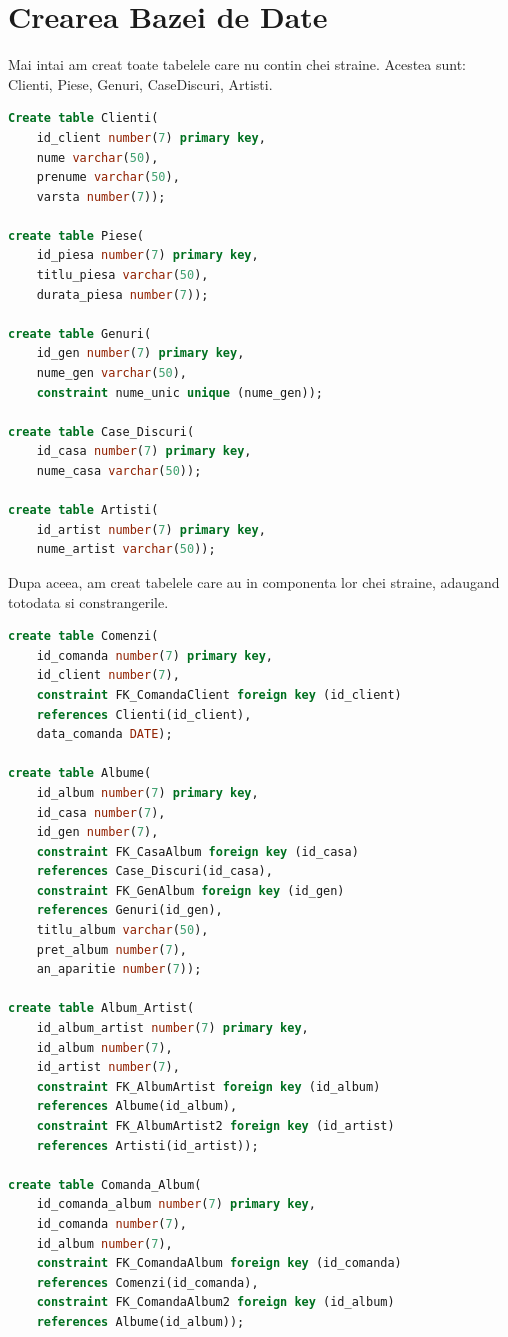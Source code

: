 \documentclass{article}
\begin{document}
\newpage

\section{Crearea Bazei de Date}
Mai intai am creat toate tabelele care nu contin chei straine. Acestea sunt: Clienti, Piese, Genuri, CaseDiscuri, Artisti.

\begin{lstlisting}[language=SQL, title=Crearea tabelelor fara chei straine]
Create table Clienti(
	id_client number(7) primary key,
	nume varchar(50),
	prenume varchar(50),
	varsta number(7)); 

create table Piese(
    id_piesa number(7) primary key,
    titlu_piesa varchar(50),
    durata_piesa number(7));
    
create table Genuri(
    id_gen number(7) primary key,
    nume_gen varchar(50),
    constraint nume_unic unique (nume_gen));
    
create table Case_Discuri(
    id_casa number(7) primary key,
    nume_casa varchar(50));

create table Artisti(
    id_artist number(7) primary key,
    nume_artist varchar(50));

\end{lstlisting}

Dupa aceea, am creat tabelele care au in componenta lor chei straine, adaugand totodata si constrangerile.

\begin{lstlisting}[language=SQL, title=Crearea tabelelor cu chei straine si tabelele asociative]
create table Comenzi(
    id_comanda number(7) primary key,
    id_client number(7),
    constraint FK_ComandaClient foreign key (id_client)
    references Clienti(id_client),
    data_comanda DATE);
        
create table Albume(
    id_album number(7) primary key,
    id_casa number(7),
    id_gen number(7),
    constraint FK_CasaAlbum foreign key (id_casa)
    references Case_Discuri(id_casa),
    constraint FK_GenAlbum foreign key (id_gen)
    references Genuri(id_gen),
    titlu_album varchar(50),
    pret_album number(7),
    an_aparitie number(7));

create table Album_Artist(
    id_album_artist number(7) primary key,
    id_album number(7),
    id_artist number(7),
    constraint FK_AlbumArtist foreign key (id_album)
    references Albume(id_album),
    constraint FK_AlbumArtist2 foreign key (id_artist)
    references Artisti(id_artist));

create table Comanda_Album(
    id_comanda_album number(7) primary key,
    id_comanda number(7),
    id_album number(7),
    constraint FK_ComandaAlbum foreign key (id_comanda)
    references Comenzi(id_comanda),
    constraint FK_ComandaAlbum2 foreign key (id_album)
    references Albume(id_album));
\end{lstlisting}
\end{document}
